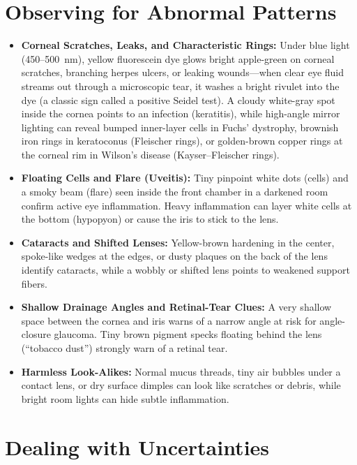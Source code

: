 \section{Observing for Abnormal Patterns}

\begin{itemize}
    \item \textbf{Corneal Scratches, Leaks, and Characteristic Rings:} Under blue light (450--500~nm), yellow fluorescein dye glows bright apple-green on corneal scratches, branching herpes ulcers, or leaking wounds---when clear eye fluid streams out through a microscopic tear, it washes a bright rivulet into the dye (a classic sign called a positive Seidel test). A cloudy white-gray spot inside the cornea points to an infection (keratitis), while high-angle mirror lighting can reveal bumped inner-layer cells in Fuchs' dystrophy, brownish iron rings in keratoconus (Fleischer rings), or golden-brown copper rings at the corneal rim in Wilson's disease (Kayser--Fleischer rings).
    \item \textbf{Floating Cells and Flare (Uveitis):} Tiny pinpoint white dots (cells) and a smoky beam (flare) seen inside the front chamber in a darkened room confirm active eye inflammation. Heavy inflammation can layer white cells at the bottom (hypopyon) or cause the iris to stick to the lens.
    \item \textbf{Cataracts and Shifted Lenses:} Yellow-brown hardening in the center, spoke-like wedges at the edges, or dusty plaques on the back of the lens identify cataracts, while a wobbly or shifted lens points to weakened support fibers.
    \item \textbf{Shallow Drainage Angles and Retinal-Tear Clues:} A very shallow space between the cornea and iris warns of a narrow angle at risk for angle-closure glaucoma. Tiny brown pigment specks floating behind the lens (``tobacco dust'') strongly warn of a retinal tear.
    \item \textbf{Harmless Look-Alikes:} Normal mucus threads, tiny air bubbles under a contact lens, or dry surface dimples can look like scratches or debris, while bright room lights can hide subtle inflammation.
\end{itemize}

\section{Dealing with Uncertainties}

